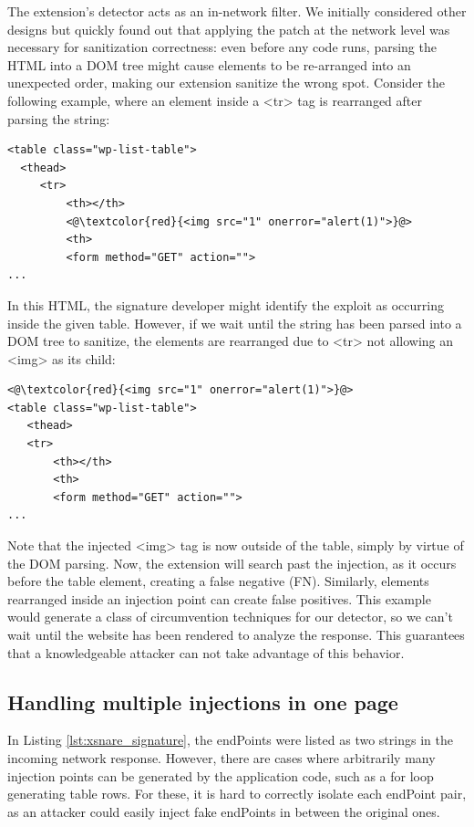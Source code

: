 The extension's detector acts as an in-network filter. We initially considered other designs but quickly found out that applying the patch at the network level was necessary for sanitization correctness: even before any code runs, parsing the HTML into a DOM tree
might cause elements to be re-arranged into an unexpected order,
making our extension sanitize the wrong spot.  Consider the following
example, where an element inside a <tr> tag is rearranged after
parsing the string:

\begin{lstlisting}
<table class="wp-list-table">
  <thead>
     <tr>
	     <th></th>
	     <@\textcolor{red}{<img src="1" onerror="alert(1)">}@>
	     <th>
   	     <form method="GET" action="">
...
\end{lstlisting}

In this HTML, the signature developer might identify the exploit as
occurring inside the given table. However, if we wait until the string
has been parsed into a DOM tree to sanitize, the elements are
rearranged due to <tr> not allowing an <img> as its child:

\begin{lstlisting}
<@\textcolor{red}{<img src="1" onerror="alert(1)">}@>
<table class="wp-list-table">
   <thead>
   <tr>
	   <th></th>
	   <th>
       <form method="GET" action="">
...
\end{lstlisting}

Note that the injected <img> tag is now outside of the table, simply
by virtue of the DOM parsing. Now, the extension will search past the
injection, as it occurs before the table element, creating a false
negative (FN). Similarly, elements rearranged inside an injection
point can create false positives. This example would generate a class
of circumvention techniques for our detector, so we can't wait until
the website has been rendered to analyze the response. This guarantees
that a knowledgeable attacker can not take advantage of this
behavior.

\subsection{Handling multiple injections in one page} \label{multiple_injections}

In Listing \ref{lst:xsnare_signature}, the endPoints were listed as
two strings in the incoming network response. However, there are cases
where arbitrarily many injection points can be generated by the
application code, such as a for loop generating table rows. For these,
it is hard to correctly isolate each endPoint pair, as an attacker
could easily inject fake endPoints in between the original ones.

